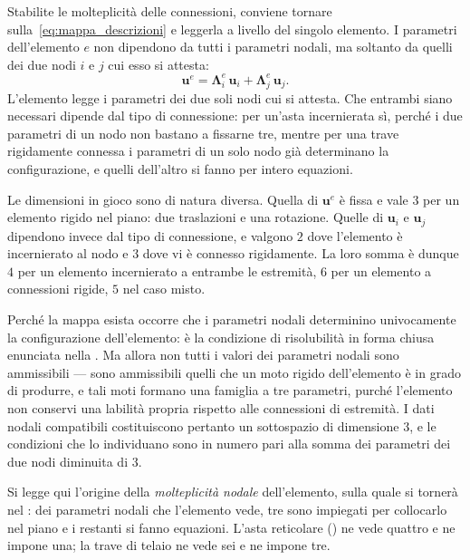 \begin{oss}\label{oss:lambda_dimensioni}
		Stabilite le molteplicità delle connessioni, conviene tornare sulla~\eqref{eq:mappa_descrizioni} 
		e leggerla a livello del singolo elemento.
		 I parametri dell'elemento $e$ non
		dipendono da tutti i parametri nodali, ma soltanto da
		quelli dei due nodi $i$ e $j$ cui esso si attesta:
		\begin{equation}\label{eq:lambda_elemento}
		\bm{u}^e
		= \bm{\Lambda}^e_i\,\bm{u}_i + \bm{\Lambda}^e_j\,\bm{u}_j .
	\end{equation}
		L'elemento legge i parametri dei due soli nodi cui si
		attesta. Che entrambi siano necessari dipende dal tipo
		di connessione: per un'asta incernierata sì, perché i
		due parametri di un nodo non bastano a fissarne tre,
		mentre per una trave rigidamente connessa i parametri
		di un solo nodo già determinano la configurazione, e
		quelli dell'altro si fanno per intero equazioni.
		
		Le dimensioni in gioco sono di natura diversa. Quella di
		$\bm{u}^e$ è fissa e vale $3$ per un elemento
		rigido nel piano: due traslazioni e una rotazione. Quelle
		di $\bm{u}_i$ e $\bm{u}_j$ dipendono invece dal tipo di
		connessione, e valgono $2$ dove l'elemento è
		incernierato al nodo e $3$ dove vi è connesso
		rigidamente. La loro somma è dunque $4$ per un
		elemento incernierato a entrambe le estremità, $6$ per un
		elemento a connessioni rigide, $5$ nel caso misto.
		
		Perché la mappa esista occorre che i parametri nodali
		determinino univocamente la configurazione dell'elemento:
		è la condizione di risolubilità in forma chiusa enunciata nella . 
		Ma allora non tutti i valori dei parametri nodali
		sono ammissibili --- sono ammissibili quelli che un moto
		rigido dell'elemento è in grado di produrre, e tali moti
		formano una famiglia a tre parametri, purché l'elemento non conservi una 
		labilità propria rispetto alle connessioni di estremità. I dati nodali
		compatibili costituiscono pertanto un sottospazio di
		dimensione $3$, e le condizioni che lo individuano sono in
		numero pari alla somma dei parametri dei due nodi
		diminuita di $3$.
		
		Si legge qui l'origine della \emph{molteplicità nodale}
		dell'elemento, sulla quale si tornerà nel
		: dei parametri nodali che
		l'elemento vede, tre sono impiegati per collocarlo nel
		piano e i restanti si fanno equazioni. L'asta reticolare ()
		ne vede quattro e ne impone una; la trave di telaio ne
		vede sei e ne impone tre.
		

\end{oss}
